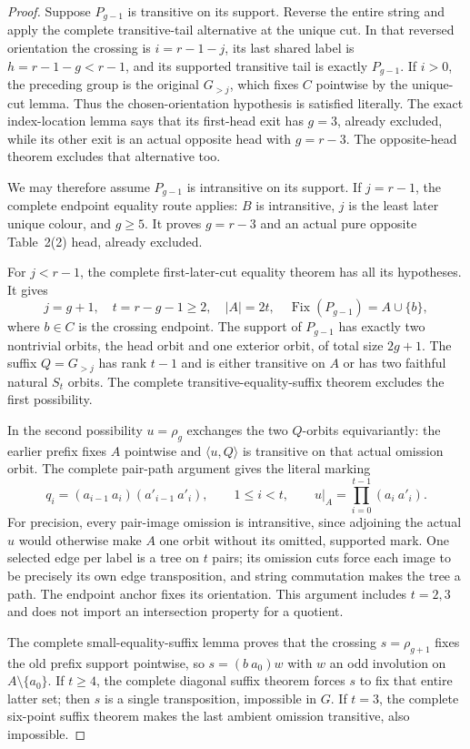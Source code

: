 \documentclass[11pt,a4paper]{article}
\newcommand{\gen}[1]{\langle#1\rangle}
\begin{document}
\begin{proof}
Suppose $P_{g-1}$ is transitive on its support. Reverse the
entire string and apply the complete transitive-tail alternative
at the unique cut. In that reversed orientation the crossing
is $i=r-1-j$, its last shared label is $h=r-1-g<r-1$,
and its supported transitive tail is exactly $P_{g-1}$.
If $i>0$, the preceding group is the original $G_{>j}$,
which fixes $C$ pointwise by the unique-cut lemma. Thus the
chosen-orientation hypothesis is satisfied literally.
The exact index-location lemma says that
its first-head exit has $g=3$, already excluded, while its
other exit is an actual opposite head with $g=r-3$.
The opposite-head theorem excludes that alternative too.

We may therefore assume $P_{g-1}$ is intransitive on its
support. If $j=r-1$, the complete endpoint equality route
applies: $B$ is intransitive, $j$ is the least later unique
colour, and $g\ge5$. It proves $g=r-3$ and an actual pure
opposite Table~2(2) head, already excluded.

For $j<r-1$, the complete first-later-cut equality theorem
has all its hypotheses. It gives
\[
 j=g+1,\quad t=r-g-1\ge2,\quad |A|=2t,\quad
 \operatorname{Fix}(P_{g-1})=A\cup\{b\},
\]
where $b\in C$ is the crossing endpoint. The support of
$P_{g-1}$ has exactly two nontrivial orbits, the head orbit
and one exterior orbit, of total size $2g+1$.
The suffix $Q=G_{>j}$ has rank $t-1$ and is either
transitive on $A$ or has two faithful natural $S_t$ orbits.
The complete transitive-equality-suffix theorem excludes
the first possibility.

In the second possibility $u=\rho_g$ exchanges the two
$Q$-orbits equivariantly: the earlier prefix fixes $A$
pointwise and $\gen{u,Q}$ is transitive on that actual
omission orbit. The complete pair-path argument gives the
literal marking
\[
 q_i=(a_{i-1}\ a_i)(a'_{i-1}\ a'_i),\qquad 1\le i<t,
 \qquad u|_A=\prod_{i=0}^{t-1}(a_i\ a'_i).
\]
For precision, every pair-image omission is intransitive,
since adjoining the actual $u$ would otherwise make $A$
one orbit without its omitted, supported mark. One selected
edge per label is a tree on $t$ pairs; its omission cuts force
each image to be precisely its own edge transposition, and
string commutation makes the tree a path. The endpoint anchor
fixes its orientation. This argument includes $t=2,3$ and
does not import an intersection property for a quotient.

The complete small-equality-suffix lemma proves that the
crossing $s=\rho_{g+1}$ fixes the old prefix support pointwise,
so $s=(b\ a_0)w$ with $w$ an odd involution on
$A\setminus\{a_0\}$. If $t\ge4$, the complete diagonal
suffix theorem forces $s$ to fix that entire latter set;
then $s$ is a single transposition, impossible in $G$.
If $t=3$, the complete six-point suffix theorem makes the
last ambient omission transitive, also impossible.


\end{proof}
\end{document}
